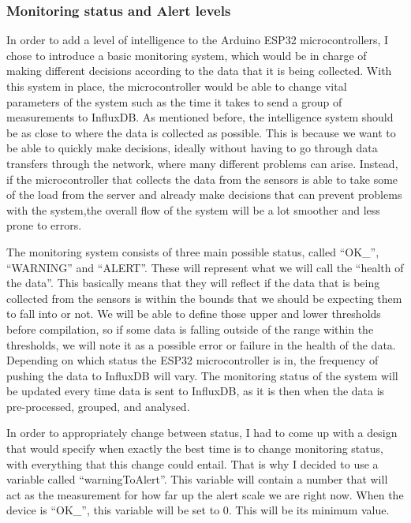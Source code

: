 \documentclass[12pt]{article}
\begin{document}
\subsubsection{Monitoring status and Alert levels}

In order to add a level of intelligence to the Arduino ESP32 microcontrollers, I chose to introduce a basic monitoring system, which would be in charge of making different decisions according to the data that it is being collected. With this system in place, the microcontroller would be able to change vital parameters of the system such as the time it takes to send a group of measurements to InfluxDB. As mentioned before, the intelligence system should be as close to where the data is collected as possible. This is because we want to be able to quickly make decisions, ideally without having to go through data transfers through the network, where many different problems can arise. Instead, if the microcontroller that collects the data from the sensors is able to take some of the load from the server and already make decisions that can prevent problems with the system,the overall flow of the system will be a lot smoother and less prone to errors.\par

The monitoring system consists of three main possible status, called ``OK\_'', ``WARNING'' and ``ALERT''. These will represent what we will call the ``health of the data''. This basically means that they will reflect if the data that is being collected from the sensors is within the bounds that we should be expecting them to fall into or not. We will be able to define those upper and lower thresholds before compilation, so if some data is falling outside of the range within the thresholds, we will note it as a possible error or failure in the health of the data. Depending on which status the ESP32 microcontroller is in, the frequency of pushing the data to InfluxDB will vary. The monitoring status of the system will be updated every time data is sent to InfluxDB, as it is then when the data is pre-processed, grouped, and analysed.\par

In order to appropriately change between status, I had to come up with a design that would specify when exactly the best time is to change monitoring status, with everything that this change could entail. That is why I decided to use a variable called ``warningToAlert''. This variable will contain a number that will act as the measurement for how far up the alert scale we are right now. When the device is ``OK\_'', this variable will be set to 0. This will be its minimum value. \par
\end{document}
